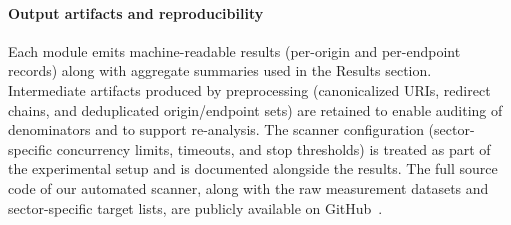 \documentclass[a4paper,fleqn]{cas-sc}
\begin{document}
    \paragraph{Output artifacts and reproducibility}
    Each module emits machine-readable results (per-origin and per-endpoint records) along with aggregate summaries used in the Results section. 
    Intermediate artifacts produced by preprocessing (canonicalized URIs, redirect chains, and deduplicated origin/endpoint sets) are retained to enable auditing of denominators and to support re-analysis. The scanner configuration (sector-specific concurrency limits, timeouts, and stop thresholds) is treated as part of the experimental setup and is documented alongside the results.
    The full source code of our automated scanner, along with the raw measurement datasets and sector-specific target lists, are publicly available on GitHub~\cite{latta_scanner_2026}.


\end{document}
